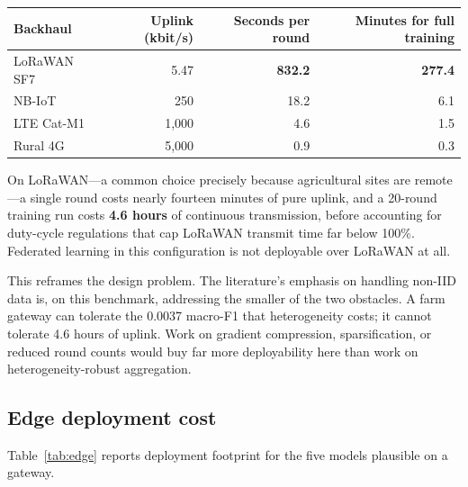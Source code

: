 \begin{wtable}
\centering
\footnotesize
\caption{Uplink cost of federated training (28{,}450 parameters, 5 clients,
20 rounds).}
\label{tab:comms}
\begin{fittable}
\begin{tabular}{lrrr}
\toprule
Backhaul & Uplink (kbit/s) & Seconds per round & Minutes for full training \\
\midrule
LoRaWAN SF7 & 5.47     & \textbf{832.2} & \textbf{277.4} \\
NB-IoT      & 250      & 18.2 & 6.1 \\
LTE Cat-M1  & 1{,}000  & 4.6  & 1.5 \\
Rural 4G    & 5{,}000  & 0.9  & 0.3 \\
\bottomrule
\end{tabular}
\end{fittable}
\end{wtable}

On LoRaWAN---a common choice precisely because agricultural sites are
remote---a single round costs nearly fourteen minutes of pure uplink, and a
20-round training run costs \textbf{4.6 hours} of continuous transmission,
before accounting for duty-cycle regulations that cap LoRaWAN transmit time far
below 100\%. Federated learning in this configuration is not deployable over
LoRaWAN at all.

This reframes the design problem. The literature's emphasis on handling non-IID
data is, on this benchmark, addressing the smaller of the two obstacles. A farm
gateway can tolerate the 0.0037 macro-F1 that heterogeneity costs; it cannot
tolerate 4.6 hours of uplink. Work on gradient compression, sparsification, or
reduced round counts would buy far more deployability here than work on
heterogeneity-robust aggregation.

\subsection{Edge deployment cost}
\label{sec:edge}

Table~\ref{tab:edge} reports deployment footprint for the five models plausible
on a gateway.


